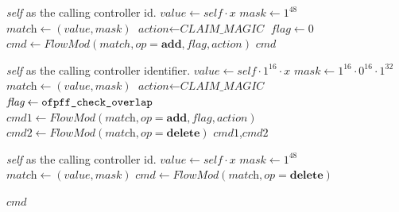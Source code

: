 \documentclass[conference]{sigcomm-alternate}
\newcommand{\concat}[0]{\cdot}
\newcommand{\claimcheck}{check\xspace}
\newcommand{\add}{\textbf{add}\xspace}
\newcommand{\dele}{\textbf{delete}\xspace}
\newcommand{\checko}{\texttt{check\_overlap}\xspace}
\newcommand{\ones}[1]{1^{#1}}
\newcommand{\zeros}[1]{0^{#1}}
\newcommand{\claimmagic}{\textit{CLAIM\_MAGIC}}
\begin{document}
{\small

\begin{algorithm}[t]
    \caption{$\textit{claim}(x)$}
    \label{alg:claim}
    \begin{algorithmic}[1]
    \Require \emph{self} as the calling controller id.
    		\State $\textit{value} \gets self\concat x$
    		\State $\textit{mask} \gets \ones{48}$
	    	\State $\textit{match} \gets (\textit{value},\textit{mask})$
    		\State $\textit{action} \gets \claimmagic$
    		\State $\textit{flag} \gets 0$
    		\State $\textit{cmd}\gets \textit{FlowMod}(match, op = \add, \textit{flag}, \textit{action}) $
			\Return $\textit{cmd}$
    \end{algorithmic}
\end{algorithm}

\begin{algorithm}[t]
    \caption{$\textit{\claimcheck}(x)$}
    \label{alg:check}
    \begin{algorithmic}[1]
    \Require \emph{self} as the calling controller identifier.
    		\State $\textit{value} \gets self\concat \ones{16}\concat x$
    		\State $\textit{mask} \gets \ones{16}\concat \zeros{16}\concat \ones{32}$
    		\State $\textit{match} \gets (value,mask)$
    		\State $\textit{action} \gets \claimmagic$
    		\State $\textit{flag} \gets \texttt{ofpff\_\checko}$
    		\State $\textit{cmd1}\gets \textit{FlowMod}(\textit{match}, op = \add, \textit{flag}, \textit{action}) $
    		\State $\textit{cmd2}\gets \textit{FlowMod}(\textit{match}, op = \dele) $
			\Return $\textit{cmd1}$,$\textit{cmd2}$
    \end{algorithmic}
\end{algorithm}

\begin{algorithm}[t]
    \caption{$\textit{unclaim}(x)$}
    \label{alg:unclaim}
    \begin{algorithmic}[1]
    \Require \emph{self} as the calling controller id.
    		\State $\textit{value} \gets self\concat x$
    		\State $\textit{mask} \gets \ones{48}$
    		\State $\textit{match} \gets (\textit{value},\textit{mask})$
    		\State $\textit{cmd}\gets \textit{FlowMod}(\textit{match}, op=\dele) $
    	
			
			\Return $cmd$
    \end{algorithmic}
\end{algorithm}
}
\end{document}
